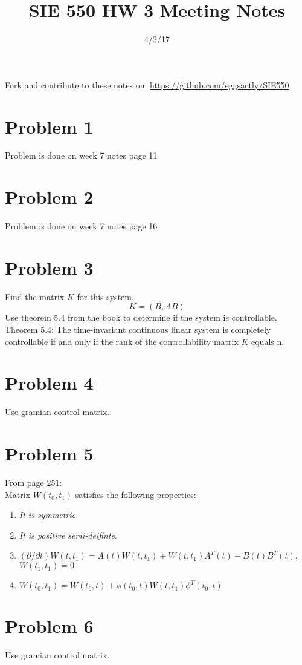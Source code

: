 \documentclass[12pt]{article}
\begin{document}
\title{SIE 550 HW 3 Meeting Notes}
\date{4/2/17}

\maketitle

Fork and contribute to these notes on: \url{https://github.com/eggsactly/SIE550}

\section*{Problem 1}
Problem is done on week 7 notes page 11

\section*{Problem 2}
Problem is done on week 7 notes page 16

\section*{Problem 3}
Find the matrix $K$ for this system.
$$K=(B,AB)$$
Use theorem 5.4 from the book to determine if the system is controllable. 
Theorem 5.4: The time-invariant continuous linear system is completely controllable if and only if the rank of the controllability matrix $K$ equals n.


\section*{Problem 4}
Use gramian control matrix. 

\section*{Problem 5} 
From page 251:\\
Matrix $W(t_0,t_1)$ satisfies the following properties:
\renewcommand{\labelenumiii}{\Roman{enumiii}}
\begin{enumerate}
  \item {\em It is symmetric.}
  \item {\em It is positive semi-deifinte}. 
  \item $(\partial/\partial t)W(t,t_1)=A(t)W(t,t_1)+W(t,t_1)A^T(t)-B(t)B^T(t)$, \\$W(t_1,t_1)=0$
  \item $W(t_0,t_1)=W(t_0,t)+\phi(t_0,t)W(t,t_1)\phi^T(t_0,t)$
\end{enumerate}

\section*{Problem 6}
Use gramian control matrix. 
\end{document}
